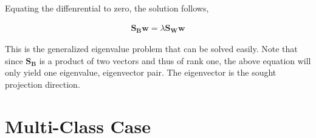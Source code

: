 \documentclass[11pt, a4paper]{article}
\begin{document}
Equating the diffenrential to zero, the solution follows,

\begin{align*}
	\boldsymbol{S_B}\boldsymbol{w} = \lambda \boldsymbol{S_W}\boldsymbol{w} 
\end{align*}

This is the generalized eigenvalue problem that can be solved easily. Note that since $\boldsymbol{S_B}$ is a product of two vectors and thus of rank one, the above equation will only yield one eigenvalue, eigenvector pair. The eigenvector is the sought projection direction.

\section{Multi-Class Case}
 
\end{document}
